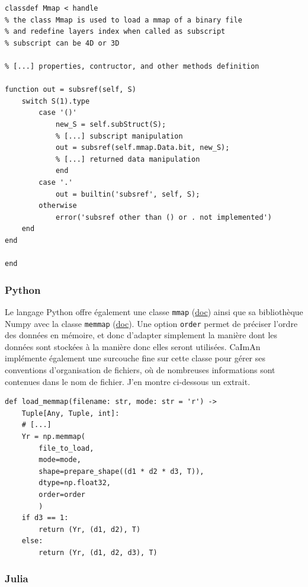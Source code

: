 \matlabstyle
\begin{lstlisting}
classdef Mmap < handle
% the class Mmap is used to load a mmap of a binary file
% and redefine layers index when called as subscript
% subscript can be 4D or 3D

% [...] properties, contructor, and other methods definition

function out = subsref(self, S)        
    switch S(1).type
        case '()'
            new_S = self.subStruct(S);
            % [...] subscript manipulation
            out = subsref(self.mmap.Data.bit, new_S);
            % [...] returned data manipulation
            end
        case '.'
            out = builtin('subsref', self, S);
        otherwise
            error('subsref other than () or . not implemented')
    end        
end

end
\end{lstlisting}

\subsubsection{Python}

Le langage Python offre également une classe \verb|mmap| (\href{https://docs.python.org/3.8/library/mmap.html}{doc}) ainsi que sa bibliothèque Numpy avec la classe \verb|memmap| (\href{https://numpy.org/devdocs/reference/generated/numpy.memmap.html}{doc}). Une option \verb|order| permet de préciser l'ordre des données en mémoire, et donc d'adapter simplement la manière dont les données sont stockées à la manière donc elles seront utilisées. CaImAn implémente également une surcouche fine sur cette classe pour gérer ses conventions d'organisation de fichiers, où de nombreuses informations sont contenues dans le nom de fichier. J'en montre ci-dessous un extrait.

\pythonstyle
\begin{lstlisting}
def load_memmap(filename: str, mode: str = 'r') ->
    Tuple[Any, Tuple, int]:
    # [...]
    Yr = np.memmap(
        file_to_load,
        mode=mode,
        shape=prepare_shape((d1 * d2 * d3, T)),
        dtype=np.float32,
        order=order
        )
    if d3 == 1:
        return (Yr, (d1, d2), T)
    else:
        return (Yr, (d1, d2, d3), T)
\end{lstlisting}


\subsubsection{Julia}

